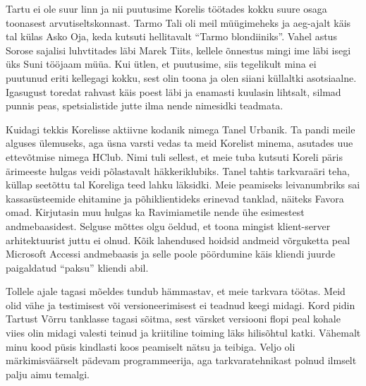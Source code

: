 Tartu ei ole suur linn ja nii puutusime Korelis töötades kokku suure osaga 
toonasest arvutiseltskonnast. Tarmo Tali oli meil 
müügimeheks ja aeg-ajalt käis tal külas Asko Oja, keda kutsuti
hellitavalt \enquote{Tarmo blondiiniks}. Vahel astus Sorose sajalisi 
luhvtitades läbi Marek Tiits, kellele õnnestus mingi ime läbi 
isegi üks Suni tööjaam müüa. Kui ütlen, et puutusime, siis tegelikult 
mina ei puutunud eriti kellegagi kokku, sest olin toona ja olen siiani küllaltki 
asotsiaalne. Igasugust toredat rahvast käis poest läbi ja enamasti kuulasin lihtsalt, 
silmad punnis peas, spetsialistide jutte ilma nende nimesidki teadmata. 

Kuidagi tekkis Korelisse aktiivne kodanik nimega Tanel 
Urbanik. Ta pandi meile alguses ülemuseks, aga üsna 
varsti vedas ta meid Korelist minema, asutades uue ettevõtmise nimega HClub. 
Nimi tuli sellest, et meie tuba kutsuti Koreli päris ärimeeste hulgas veidi põlastavalt 
häkkeriklubiks. Tanel tahtis tarkvaraäri teha, küllap seetõttu tal 
Koreliga teed lahku läksidki. Meie peamiseks leivanumbriks sai kassasüsteemide 
ehitamine ja põhiklientideks erinevad tanklad, näiteks Favora omad. 
Kirjutasin muu hulgas ka Ravimiametile nende ühe 
esimestest andmebaasidest. Selguse mõttes olgu öeldud, et toona mingist 
klient-server arhitektuurist juttu ei olnud. Kõik lahendused hoidsid andmeid 
võrguketta peal Microsoft Accessi andmebaasis ja selle 
poole pöördumine käis kliendi juurde paigaldatud \enquote{paksu} kliendi abil. 

Tollele ajale tagasi mõeldes tundub hämmastav, et meie tarkvara töötas. Meid 
olid vähe ja testimisest või versioneerimisest ei 
teadnud keegi midagi. Kord pidin Tartust Võrru tanklasse tagasi 
sõitma, sest värsket versiooni flopi peal kohale viies olin midagi valesti 
teinud ja kriitiline toiming läks hilisõhtul katki. Vähemalt minu kood püsis 
kindlasti koos peamiselt nätsu ja teibiga. Veljo oli märkimisväärselt pädevam programmeerija, aga tarkvaratehnikast polnud 
ilmselt palju aimu temalgi. 

